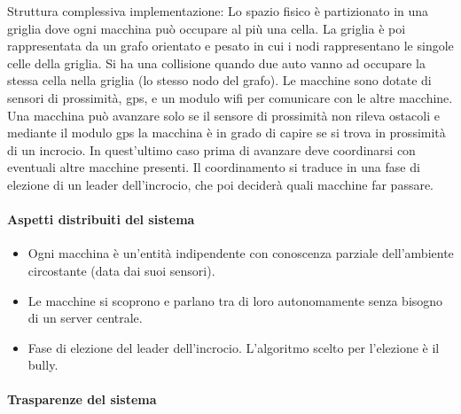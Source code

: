 \documentclass{memoir}
\begin{document}
Struttura complessiva implementazione: Lo spazio fisico è partizionato in una
griglia dove ogni macchina può occupare al più una cella. La griglia è poi
rappresentata da un grafo orientato e pesato in cui i nodi rappresentano le
singole celle della griglia. Si ha una collisione quando due auto vanno ad
occupare la stessa cella nella griglia (lo stesso nodo del grafo). Le macchine
sono dotate di sensori di prossimità, gps, e un modulo wifi per comunicare con
le altre macchine. Una macchina può avanzare solo se il sensore di prossimità
non rileva ostacoli e mediante il modulo gps la macchina è in grado di capire se
si trova in prossimità di un incrocio. In quest'ultimo caso prima di avanzare
deve coordinarsi con eventuali altre macchine presenti. Il coordinamento si
traduce in una fase di elezione di un leader dell'incrocio, che poi deciderà
quali macchine far passare.

\paragraph{Aspetti distribuiti del sistema}

\begin{itemize}
\item Ogni macchina è un'entità indipendente con conoscenza parziale
  dell'ambiente circostante (data dai suoi sensori).
\item Le macchine si scoprono e parlano tra di loro autonomamente senza bisogno
  di un server centrale.
\item Fase di elezione del leader dell'incrocio. L'algoritmo scelto per
  l'elezione è il bully.
\end{itemize}

\paragraph{Trasparenze del sistema}
\end{document}

